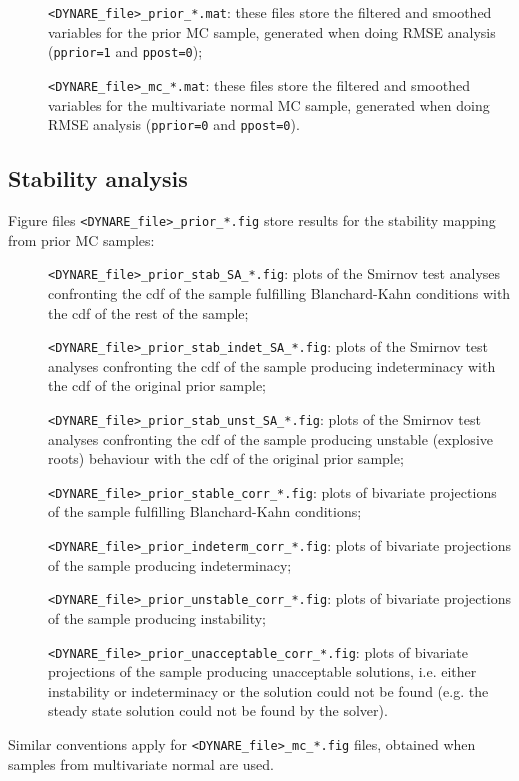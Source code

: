 \documentclass[12pt,a4paper]{article}
\begin{document}
\begin{description}
\item[]\verb"<DYNARE_file>_prior_*.mat": these files store
the filtered and smoothed variables for the prior MC sample,
generated when doing  RMSE analysis (\verb"pprior=1" and
\verb"ppost=0");
\item[]\verb"<DYNARE_file>_mc_*.mat": these files store
the filtered and smoothed variables for the multivariate normal MC
sample, generated when doing  RMSE analysis (\verb"pprior=0" and
\verb"ppost=0").
\end{description}

\subsection{Stability analysis}
Figure files \verb"<DYNARE_file>_prior_*.fig" store results for
the stability mapping from prior MC samples:
\begin{description}
\item[]\verb"<DYNARE_file>_prior_stab_SA_*.fig": plots of the Smirnov
test analyses confronting the cdf of the sample fulfilling
Blanchard-Kahn conditions with the cdf of the rest of the sample;
\item[]\verb"<DYNARE_file>_prior_stab_indet_SA_*.fig": plots of the Smirnov
test analyses confronting the cdf of the sample producing
indeterminacy with the cdf of the original prior sample;
\item[]\verb"<DYNARE_file>_prior_stab_unst_SA_*.fig": plots of the Smirnov
test analyses confronting the cdf of the sample producing unstable
(explosive roots) behaviour with the cdf of the original prior
sample;
\item[]\verb"<DYNARE_file>_prior_stable_corr_*.fig": plots of
bivariate projections of the sample fulfilling Blanchard-Kahn
conditions;
\item[]\verb"<DYNARE_file>_prior_indeterm_corr_*.fig": plots of
bivariate projections of the sample producing indeterminacy;
\item[]\verb"<DYNARE_file>_prior_unstable_corr_*.fig":  plots of
bivariate projections of the sample producing instability;
\item[]\verb"<DYNARE_file>_prior_unacceptable_corr_*.fig": plots of
bivariate projections of the sample producing unacceptable
solutions, i.e. either instability or indeterminacy or the
solution could not be found (e.g. the steady state solution could
not be found by the solver).
\end{description}
Similar conventions apply for \verb"<DYNARE_file>_mc_*.fig" files,
obtained when samples from multivariate normal are used.
\end{document}
